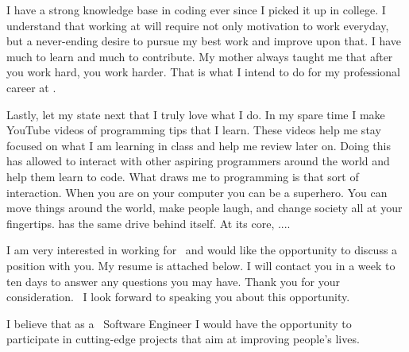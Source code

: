 \documentclass{my_cv}
\begin{document}
I have a strong knowledge base in coding ever since I picked it up in
college.  I understand that working at \companyName will require not only
motivation to work everyday, but a never-ending desire to pursue my best
work and improve upon that.  I have much to learn and much to
contribute.  My mother always taught me that after you work hard, you
work harder.  That is what I intend to do for my professional career at
\companyName.

Lastly, let my state next that I truly love what I do.  In my spare time
I make YouTube videos of programming tips that I learn.  These videos
help me stay focused on what I am learning in class and help me review
later on.  Doing this has allowed to interact with other aspiring
programmers around the world and help them learn to code.  What draws me
to programming is that sort of interaction.  When you are on your
computer you can be a superhero.  You can move things around the world,
make people laugh, and change society all at your fingertips.  \companyName
has the same drive behind itself.  At its core, ....

I am very interested in working for \companyName \ and would like the
opportunity to discuss a position with you.  My resume is attached
below.  I will contact you in a week to ten days to answer any questions
you may have. Thank you for your consideration.   I look forward to
speaking you about this opportunity. 

I believe that as a \companyName \  Software Engineer I would have the opportunity
to participate in cutting-edge projects that aim at improving people's lives.

\makeletterclosing
\end{document}

